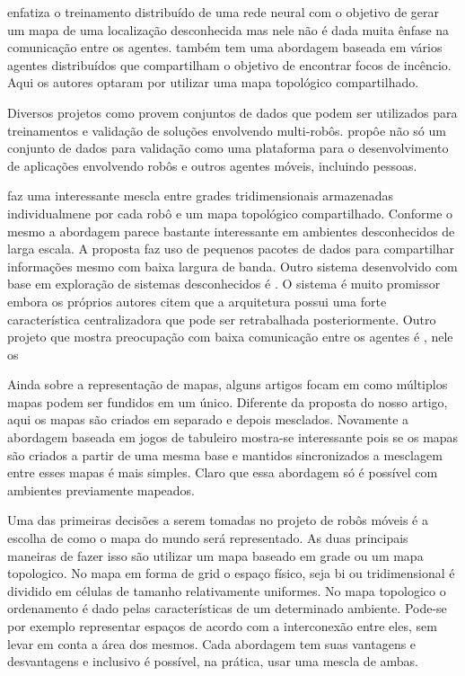 \documentclass[eq,capa]{texufpel}
\begin{document}
\cite{2023d2coplan} enfatiza o treinamento distribuído de uma rede neural com o objetivo de gerar um mapa de uma localização desconhecida mas nele não é dada muita ênfase na comunicação entre os agentes. \cite{firesearching} também tem uma abordagem baseada em vários agentes distribuídos que compartilham o objetivo de encontrar focos de incêncio. Aqui os autores optaram por utilizar uma mapa topológico compartilhado.

Diversos projetos como \cite{melo2023dataset} provem conjuntos de dados que podem ser utilizados para treinamentos e validação de soluções envolvendo multi-robôs. \cite{2020sean} propôe não só um conjunto de dados para validação como uma plataforma para o desenvolvimento de aplicações envolvendo robôs e outros agentes móveis, incluindo pessoas.



\cite{2021decentralized} faz uma interessante mescla entre grades tridimensionais armazenadas individualmene por cada robô e um mapa topológico compartilhado. Conforme o mesmo a abordagem parece bastante interessante em ambientes desconhecidos de larga escala. A proposta faz uso de pequenos pacotes de dados para compartilhar informações mesmo com baixa largura de banda. Outro sistema desenvolvido com base em exploração de sistemas desconhecidos é \cite{2022lamp}. O sistema é muito promissor embora os próprios autores citem que a arquitetura possui uma forte característica centralizadora que pode ser retrabalhada posteriormente. Outro projeto que mostra preocupação com baixa comunicação entre os agentes é \cite{2021smmr}, nele os 

Ainda sobre a representação de mapas, alguns artigos focam em como múltiplos mapas podem ser fundidos em um único\cite{2021mapmerging}. Diferente da proposta do nosso artigo, aqui os mapas são criados em separado e depois mesclados. Novamente a abordagem baseada em jogos de tabuleiro mostra-se interessante pois se os mapas são criados a partir de uma mesma base e mantidos sincronizados a mesclagem entre esses mapas é mais simples. Claro que essa abordagem só é possível com ambientes previamente mapeados.

Uma das primeiras decisões a serem tomadas no projeto de robôs móveis é a escolha de como o mapa do mundo será representado. As duas principais maneiras de fazer isso são utilizar um mapa baseado em grade ou um mapa topologico\cite{thrun1996integrating}. No mapa em forma de grid o espaço físico, seja bi ou tridimensional é dividido em células de tamanho relativamente uniformes. No mapa topologico o ordenamento é dado pelas características de um determinado ambiente. Pode-se por exemplo representar espaços de acordo com a interconexão entre eles, sem levar em conta a área dos mesmos. Cada abordagem tem suas vantagens e desvantagens e inclusivo é possível, na prática, usar uma mescla de ambas\cite{thrun1996integrating}.
\end{document}
